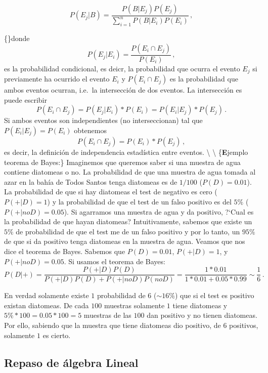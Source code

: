 \documentclass[
]{agujournal2019}
\begin{document}
\begin{equation}
P(E_j|B)=\frac{P(B|E_j)P(E_j)}{\sum^n_{i=1}P(B|E_i)P(E_i)}\,,
\end{equation}

\{\noindent\}donde \[P(E_j|E_i)=\frac{P(E_i\cap E_j)}{P(E_i)}\,,\] es la
probabilidad condicional, es deicr, la probabilidad que ocurra el evento
\(E_j\) si previamente ha ocurrido el evento \(E_i\) y
\(P(E_i \cap E_j)\) es la probabilidad que ambos eventos ocurran,
i.e.~la intersección de dos eventos. La intersección es puede escribir
\[P(E_i\cap E_j)=P(E_j|E_i)*P(E_i)=P(E_i|E_j)*P(E_j)\,.\] Si ambos
eventos son independientes (no interseccionan) tal que
\(P(E_i|E_j)=P(E_i)\) obtenemos \[P(E_i\cap E_j)=P(E_i)*P(E_j)\,,\] es
decir, la definición de independencia estadística entre eventos.
\textbackslash{} \textbackslash{} \{\textbf Ejemplo teorema de Bayes:\}
Imaginemos que queremos saber si una muestra de agua contiene diatomeas
o no. La probabilidad de que una muestra de agua tomada al azar en la
bahía de Todos Santos tenga diatomeas es de \(1/100\) (\(P(D)=0.01\)).
La probabilidad de que si hay diatomeas el test de negativo es cero
(\(P(+|D)=1\)) y la probabilidad de que el test de un falso positivo es
del \(5\%\) (\(P(+|noD)=0.05\)). Si agarramos una muestra de agua y da
positivo, ?{}`Cual es la probabilidad de que hayan diatomeas?
Intuitivamente, sabemos que existe un \(5\%\) de probabilidad de que el
test me de un falso positivo y por lo tanto, un \(95\%\) de que si da
positivo tenga diatomeas en la muestra de agua. Veamos que nos dice el
teorema de Bayes. Sabemos que \(P(D)=0.01\), \(P(+|D)=1\), y
\(P(+|noD)=0.05\). Si usamos el teorema de Bayes:
\[ P(D|+)=\frac{P(+|D)P(D)}{P(+|D)P(D) + P(+|noD)P(noD)}=
          \frac{1*0.01}{1*0.01+0.05*0.99}\sim\frac{1}{6}\,.\]

En verdad solamente existe \(1\) probabilidad de \(6\) (\(\sim16\%\))
que si el test es positivo existan diatomeas. De cada \(100\) muestras
solamente \(1\) tiene diatomeas y \(5\%*100=0.05*100=5\) muestras de las
\(100\) dan positivo y no tienen diatomeas. Por ello, sabiendo que la
muestra que tiene diatomeas dio positivo, de \(6\) positivos, solamente
\(1\) es cierto.




\hypertarget{repaso-de-uxe1lgebra-lineal}{%
\subsection{Repaso de álgebra
Lineal}\label{repaso-de-uxe1lgebra-lineal}}
\end{document}

